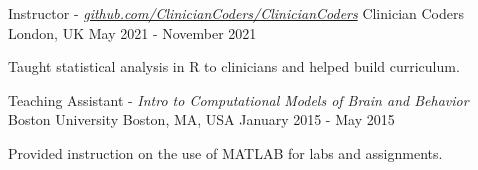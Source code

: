 %
%
%


\vspace*{0.4cm}

\begin{cventries}

    \cventry
        {Instructor - \textit{\href{https://github.com/ClinicianCoders/ClinicianCoders}{github.com/ClinicianCoders/ClinicianCoders}}}
        {Clinician Coders}
        {London, UK}
        {May 2021 - November 2021}
        {
            \begin{cvitems}
                \item Taught statistical analysis in R to clinicians and helped build curriculum.
            \end{cvitems}\vspace{1.5\baselineskip}
        }

    \vspace*{0.2cm}

    \cventry
        {Teaching Assistant - \textit{Intro to Computational Models of Brain and Behavior}}
        {Boston University}
        {Boston, MA, USA}
        {January 2015 - May 2015}
        {
            \begin{cvitems}
                \item Provided instruction on the use of MATLAB for labs and assignments.
            \end{cvitems}\vspace{1.5\baselineskip}
        }

\end{cventries}

\vspace*{-0.35cm}
